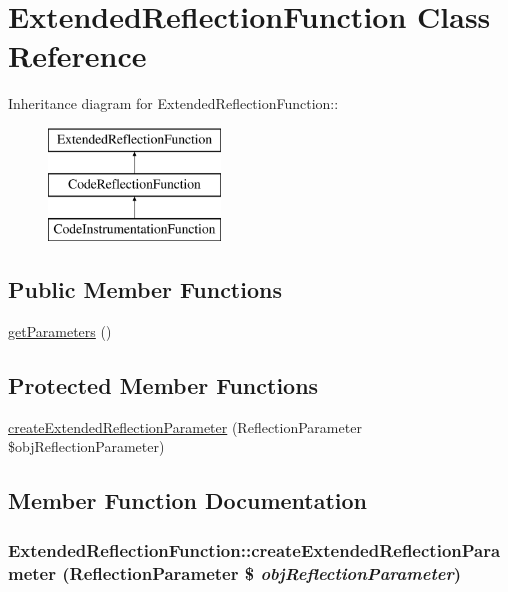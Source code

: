 \hypertarget{class_extended_reflection_function}{
\section{ExtendedReflectionFunction Class Reference}
\label{class_extended_reflection_function}
}
Inheritance diagram for ExtendedReflectionFunction::\begin{figure}[H]
\begin{center}
\leavevmode
\includegraphics[height=3cm]{class_extended_reflection_function}
\end{center}
\end{figure}
\subsection*{Public Member Functions}
\begin{CompactItemize}
\item 
\hyperlink{class_extended_reflection_function_cfebbc64ac5e1b92c4a95c44771989c2}{getParameters} ()
\end{CompactItemize}
\subsection*{Protected Member Functions}
\begin{CompactItemize}
\item 
\hyperlink{class_extended_reflection_function_de07ccd452e54a7c8878fc20d215831e}{createExtendedReflectionParameter} (ReflectionParameter \$objReflectionParameter)
\end{CompactItemize}


\subsection{Member Function Documentation}
\hypertarget{class_extended_reflection_function_de07ccd452e54a7c8878fc20d215831e}{
\subsubsection[{createExtendedReflectionParameter}]{\setlength{\rightskip}{0pt plus 5cm}ExtendedReflectionFunction::createExtendedReflectionParameter (ReflectionParameter \$ {\em objReflectionParameter})}}
\label{class_extended_reflection_function_de07ccd452e54a7c8878fc20d215831e}


